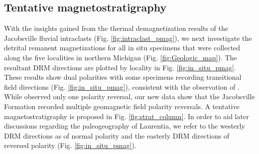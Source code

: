 \documentclass[draft]{agujournal2019}
\begin{document}
\subsection*{Tentative magnetostratigraphy}
\label{magstrat}
With the insights gained from the thermal demagnetization results of the Jacobsville fluvial intraclasts (Fig. \ref{fig:intraclast_pmag}), we next investigate the detrital remanent magnetizations for all in situ specimens that were collected along the five localities in northern Michigan (Fig. \ref{fig:Geologic_map}). The resultant DRM directions are plotted by locality in Fig. \ref{fig:in_situ_pmag}. These results show dual polarities with some specimens recording transitional field directions (Fig. \ref{fig:in_situ_pmag}), consistent with the observation of . While  observed only one polarity reversal, our new data show that the Jacobsville Formation recorded multiple geomagnetic field polarity reversals. A tentative magnetostratigraphy is proposed in Fig. \ref{fig:strat_column}. In order to aid later discussions regarding the paleogeography of Laurentia, we refer to the westerly DRM directions as of normal polarity and the easterly DRM directions of reversed polarity (Fig. \ref{fig:in_situ_pmag}). 
\end{document}
